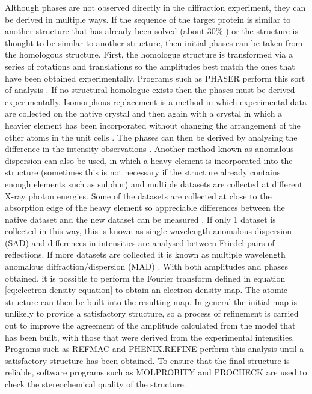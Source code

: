         Although phases are not observed directly in the diffraction experiment, they can be derived in multiple ways.
        If the sequence of the target protein is similar to another structure that has already been solved (about 30\% \cite{zeldin2013thesis}) or the structure is thought to be similar to another structure, then initial phases can be taken from the homologous structure.
        First, the homologue structure is transformed via a series of rotations and translations so the amplitudes best match the ones that have been obtained experimentally.
        Programs such as PHASER perform this sort of analysis \cite{mccoy2007phaser}.
        \newline
        If no structural homologue exists then the phases must be derived experimentally.
        Isomorphous replacement is a method in which experimental data are collected on the native crystal and then again with a crystal in which a heavier element has been incorporated without changing the arrangement of the other atoms in the unit cells \cite{perutz1956isomorphous}.
        The phases can then be derived by analysing the difference in the intensity observations \cite{taylor2010}.
        \newline
        Another method known as anomalous dispersion can also be used, in which a heavy element is incorporated into the structure (sometimes this is not necessary if the structure already contains enough elements such as sulphur) and multiple datasets are collected at different X-ray photon energies.
        Some of the datasets are collected at close to the absorption edge of the heavy element so appreciable differences between the native dataset and the new dataset can be measured \cite{bijvoet1954structure}.
        If only 1 dataset is collected in this way, this is known as single wavelength anomalous dispersion (SAD) and differences in intensities are analysed between Friedel pairs of reflections.
        If more datasets are collected it is known as multiple wavelength anomalous diffraction/dispersion (MAD) \cite{hendrickson1991determination,taylor2010}.
        \newline
        With both amplitudes and phases obtained, it is possible to perform the Fourier transform defined in equation \ref{eq:electron density equation} to obtain an electron density map.
        The atomic structure can then be built into the resulting map.
        In general the initial map is unlikely to provide a satisfactory structure, so a process of refinement is carried out to improve the agreement of the amplitude calculated from the model that has been built, with those that were derived from the experimental intensities.
        Programs such as REFMAC \cite{murshudov2011refmac5} and PHENIX.REFINE \cite{adams2010phenix} perform this analysis until a satisfactory structure has been obtained.
        To ensure that the final structure is reliable, software programs such as MOLPROBITY \cite{chen2010molprobity} and PROCHECK \cite{laskowski1993procheck} are used to check the stereochemical quality of the structure.
